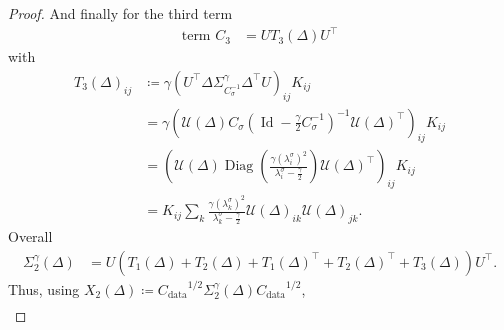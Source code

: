 \documentclass[11pt]{article}
\newcommand{\eqdef}{\coloneqq}
\newcommand{\id}{\operatorname{Id}}
\newcommand{\diag}[1]{\operatorname{Diag}\left({#1}\right)}
\begin{document}
\begin{proof}
And finally for the third term 
\begin{align*}
\text{term } C_3 &= U T_3(\Delta) U^\top
\end{align*}
with
\begin{align*}
    T_3(\Delta)_{ij} &\eqdef \gamma  \left(U^\top \Delta \Sigma^\gamma_{C_\sigma^{-1}} \Delta^\top U \right)_{ij}  K_{ij}\\
    &= \gamma   \left( \mathcal{U}(\Delta)  C_\sigma\left(\id - \frac{\gamma}{2}{{C_\sigma^{-1}}}\right)^{-1}  \mathcal{U}(\Delta)^\top \right)_{ij} K_{ij} \\
    &=  \left( \mathcal{U}(\Delta) \diag{\frac{ \gamma (\lambda^\sigma_i)^2}{\lambda^\sigma_i - \frac{\gamma}{2}}}  \mathcal{U}(\Delta)^\top \right)_{ij}  K_{ij} \\
    &=    K_{ij} \sum_{k} \frac{\gamma (\lambda^\sigma_k)^2}{\lambda^\sigma_k - \frac{\gamma}{2}} \mathcal{U}(\Delta)_{ik} \mathcal{U}(\Delta)_{jk}  .
\end{align*}
Overall
\begin{align*}
\Sigma_2^\gamma(\Delta) &= U \left(  T_1(\Delta) + T_2(\Delta) + T_1(\Delta)^\top + T_2(\Delta)^\top + T_3(\Delta) \right) U^\top .
\end{align*}
Thus, using $X_2(\Delta) \eqdef {C_\mathrm{data}}^{1/2}\Sigma^\gamma_{2} (\Delta) {C_\mathrm{data}}^{1/2}$,
\begin{align*}

\end{align*}
\end{proof}
\end{document}
